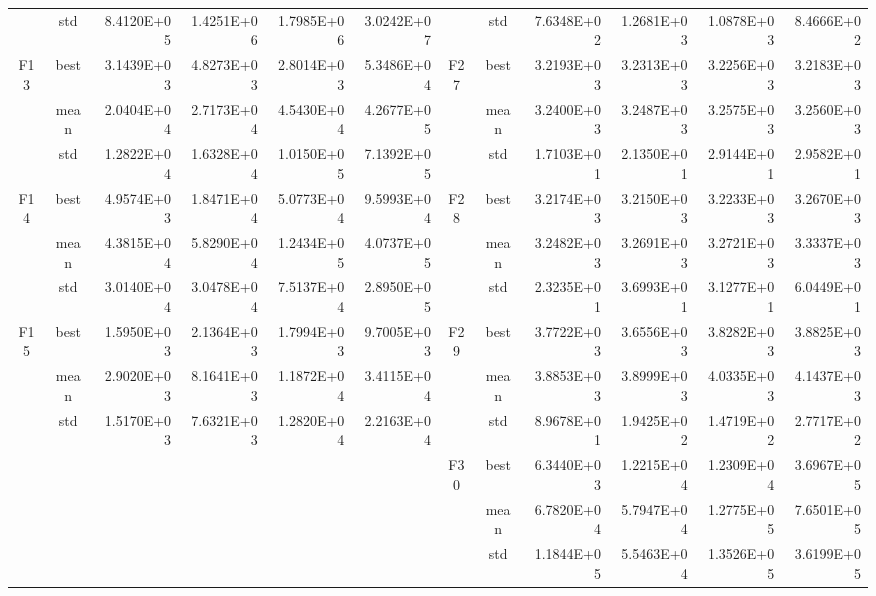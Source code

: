\documentclass{wzuthesis}
\begin{document}
\begin{table}[htbp]
\begin{tabular}{rrrrrrccrrrr}
          & \multicolumn{1}{c}{std} & 8.4120E+05 & 1.4251E+06 & 1.7985E+06 & 3.0242E+07 &       & std   & 7.6348E+02 & 1.2681E+03 & 1.0878E+03 & 8.4666E+02 \\
    \multicolumn{1}{c}{\multirow{3}[0]{*}{F13}} & \multicolumn{1}{c}{best} & 3.1439E+03 & 4.8273E+03 & 2.8014E+03 & 5.3486E+04 & \multirow{3}[0]{*}{F27} & best  & 3.2193E+03 & 3.2313E+03 & 3.2256E+03 & 3.2183E+03 \\
          & \multicolumn{1}{c}{mean} & 2.0404E+04 & 2.7173E+04 & 4.5430E+04 & 4.2677E+05 &       & mean  & 3.2400E+03 & 3.2487E+03 & 3.2575E+03 & 3.2560E+03 \\
          & \multicolumn{1}{c}{std} & 1.2822E+04 & 1.6328E+04 & 1.0150E+05 & 7.1392E+05 &       & std   & 1.7103E+01 & 2.1350E+01 & 2.9144E+01 & 2.9582E+01 \\
    \multicolumn{1}{c}{\multirow{3}[0]{*}{F14}} & \multicolumn{1}{c}{best} & 4.9574E+03 & 1.8471E+04 & 5.0773E+04 & 9.5993E+04 & \multirow{3}[0]{*}{F28} & best  & 3.2174E+03 & 3.2150E+03 & 3.2233E+03 & 3.2670E+03 \\
          & \multicolumn{1}{c}{mean} & 4.3815E+04 & 5.8290E+04 & 1.2434E+05 & 4.0737E+05 &       & mean  & 3.2482E+03 & 3.2691E+03 & 3.2721E+03 & 3.3337E+03 \\
          & \multicolumn{1}{c}{std} & 3.0140E+04 & 3.0478E+04 & 7.5137E+04 & 2.8950E+05 &       & std   & 2.3235E+01 & 3.6993E+01 & 3.1277E+01 & 6.0449E+01 \\
    \multicolumn{1}{c}{\multirow{3}[0]{*}{F15}} & \multicolumn{1}{c}{best} & 1.5950E+03 & 2.1364E+03 & 1.7994E+03 & 9.7005E+03 & \multirow{3}[0]{*}{F29} & best  & 3.7722E+03 & 3.6556E+03 & 3.8282E+03 & 3.8825E+03 \\
          & \multicolumn{1}{c}{mean} & 2.9020E+03 & 8.1641E+03 & 1.1872E+04 & 3.4115E+04 &       & mean  & 3.8853E+03 & 3.8999E+03 & 4.0335E+03 & 4.1437E+03 \\
          & \multicolumn{1}{c}{std} & 1.5170E+03 & 7.6321E+03 & 1.2820E+04 & 2.2163E+04 &       & std   & 8.9678E+01 & 1.9425E+02 & 1.4719E+02 & 2.7717E+02 \\
          &       &       &       &       &       & \multirow{3}[0]{*}{F30} & best  & 6.3440E+03 & 1.2215E+04 & 1.2309E+04 & 3.6967E+05 \\
          &       &       &       &       &       &       & mean  & 6.7820E+04 & 5.7947E+04 & 1.2775E+05 & 7.6501E+05 \\
          &       &       &       &       &       &       & std   & 1.1844E+05 & 5.5463E+04 & 1.3526E+05 & 3.6199E+05 \\
    \bottomrule
    \end{tabular}%
  \label{tb:ablation-dim50}%
\end{table}%
\end{document}
